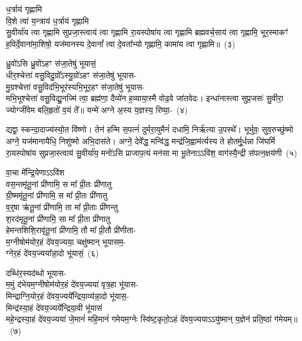 ध॒र्त्राय॑ गृह्णामि\\
वि॒शे त्वा॑ य॒न्त्राय॑ ध॒र्त्राय॑ गृह्णामि\\
सु॒वीर्या॑य त्वा गृह्णामि सुप्रजा॒स्त्वाय॑ त्वा गृह्णामि रा॒यस्पोषा॑य त्वा गृह्णामि ब्रह्मवर्च॒साय॑ त्वा गृह्णामि॒ भूर॒स्माकꣳ॑ ह॒विर्दे॒वाना॑मा॒शिषो॒ यज॑मानस्य दे॒वानां᳚ त्वा दे॒वता᳚भ्यो गृह्णामि॒ कामा॑य त्वा गृह्णामि॥~(३)

{\anuvakamend[{स॒त्यायु॒रोज॑से य॒न्त्राय॒ त्रय॑स्त्रिꣳशच्च}]}%

ध्रु॒वो॑\-ऽसि ध्रु॒वो॑\-ऽहꣳ स॑जा॒तेषु॑ भूयासं॒\\
धीर॒श्चेत्ता॑ वसु॒विदु॒ग्रो᳚\-ऽस्यु॒ग्रो॑\-ऽहꣳ स॑जा॒तेषु॑ भूयास-\\
मु॒ग्रश्चेत्ता॑ वसु॒विद॑भि॒भूर॑स्यभि॒भूर॒हꣳ स॑जा॒तेषु॑ भूयास-\\
मभि॒भूश्चेत्ता॑ वसु॒विद्यु॒नज्मि॑ त्वा॒ ब्रह्म॑णा॒ दैव्ये॑न ह॒व्याया॒स्मै वोढ॒वे जा॑तवेदः। इन्धा॑नास्त्वा सुप्र॒जसः॑ सु॒वीरा॒ ज्योग्जी॑वेम बलि॒हृतो॑ व॒यं ते᳚॥ यन्मे॑ अग्ने अ॒स्य य॒ज्ञस्य॒ रिष्या॒-~(४)

द्यद्वा॒ स्कन्दा॒दाज्य॑स्यो॒त वि॑ष्णो। तेन॑ हन्मि स॒पत्नं॑ दुर्मरा॒युमैनं॑ दधामि॒ निर्\mbox{}ऋ॑त्या उ॒पस्थे᳚। भूर्भुवः॒ सुव॒रुच्छु॑ष्मो अग्ने॒ यज॑मानायैधि॒ निशु॑ष्मो अभि॒दास॑ते। अग्ने॒ देवे᳚द्ध॒ मन्वि॑द्ध॒ मन्द्र॑जि॒ह्वाम॑र्त्यस्य ते होतर्मू॒र्धन्ना जि॑घर्मि रा॒यस्पोषा॑य सुप्रजा॒स्त्वाय॑ सु॒वीर्या॑य॒ मनो॑\-ऽसि प्राजाप॒त्यं मन॑सा मा भू॒तेना\-ऽ\-ऽवि॑श॒ वाग॑स्यै॒न्द्री स॑पत्न॒क्षय॑णी~(५)

वा॒चा मे᳚न्द्रि॒येणा\-ऽ\-ऽवि॑श\\
वस॒न्तमृ॑तू॒नां प्री॑णामि॒ स मा᳚ प्री॒तः प्री॑णातु\\
ग्री॒ष्ममृ॑तू॒नां प्री॑णामि॒ स मा᳚ प्री॒तः प्री॑णातु\\
व॒र्॒\mbox{}षा ऋ॑तू॒नां प्री॑णामि॒ ता मा᳚ प्री॒ताः प्री॑णन्तु\\
श॒रद॑मृतू॒नां प्री॑णामि॒ सा मा᳚ प्री॒ता प्री॑णातु\\
हेमन्तशिशि॒रावृ॑तू॒नां प्री॑णामि॒ तौ मा᳚ प्री॒तौ प्री॑णीता-\\
म॒ग्नी\-षोम॑योर॒हं दे॑वय॒ज्यया॒ चक्षु॑ष्मान् भूयासम॒-\\
ग्नेर॒हं दे॑वय॒ज्यया᳚न्ना॒दो भू॑यासं॒~(६)

दब्धि॑र॒स्यद॑ब्धो भूयास-\\
म॒मुं द॑भेयम॒ग्नी\-षोम॑योर॒हं दे॑वय॒ज्यया॑ वृत्र॒हा भू॑यास-\\
मिन्द्राग्नि॒योर॒हं दे॑वय॒ज्यये᳚न्द्रिया॒\-व्य॑न्ना॒दो भू॑यास॒-\\
मिन्द्र॑स्या॒हं दे॑वय॒ज्यये᳚न्द्रिया॒वी भू॑यासं\\
महे॒न्द्रस्या॒हं दे॑वय॒ज्यया॑ जे॒मानं॑ महि॒मानं॑ गमेयम॒ग्नेः स्वि॑ष्ट॒कृतो॒\-ऽहं दे॑वय॒ज्यया\-ऽ\-ऽयु॑ष्मान् य॒ज्ञेन॑ प्रति॒ष्ठां ग॑मेयम्॥~(७)

